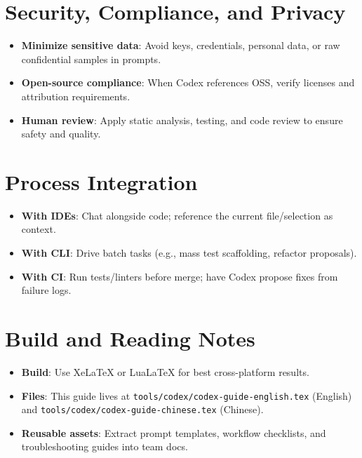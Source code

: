 \documentclass{article}
\begin{document}
\section{Security, Compliance, and Privacy}
\begin{itemize}
  \item \textbf{Minimize sensitive data}: Avoid keys, credentials, personal data, or raw confidential samples in prompts.
  \item \textbf{Open-source compliance}: When Codex references OSS, verify licenses and attribution requirements.
  \item \textbf{Human review}: Apply static analysis, testing, and code review to ensure safety and quality.
\end{itemize}

\section{Process Integration}
\begin{itemize}
  \item \textbf{With IDEs}: Chat alongside code; reference the current file/selection as context.
  \item \textbf{With CLI}: Drive batch tasks (e.g., mass test scaffolding, refactor proposals).
  \item \textbf{With CI}: Run tests/linters before merge; have Codex propose fixes from failure logs.
\end{itemize}

\section{Build and Reading Notes}
\begin{itemize}
  \item \textbf{Build}: Use XeLaTeX or LuaLaTeX for best cross-platform results.
  \item \textbf{Files}: This guide lives at \texttt{tools/codex/codex-guide-english.tex} (English) and \texttt{tools/codex/codex-guide-chinese.tex} (Chinese).
  \item \textbf{Reusable assets}: Extract prompt templates, workflow checklists, and troubleshooting guides into team docs.
\end{itemize}
\end{document}
